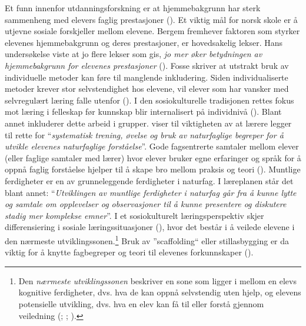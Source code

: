 \documentclass[main.tex]{subfiles}
\begin{document}
Et funn innenfor utdanningsforskning er at hjemmebakgrunn har sterk sammenheng med elevers faglig prestasjoner (). Et viktig mål for norsk skole er å utjevne sosiale forskjeller mellom elevene. Bergem fremhever faktoren som styrker elevenes hjemmebakgrunn og deres prestasjoner, er hovedsakelig lekser. Hans undersøkelse viste at jo flere lekser som gis, \emph{jo mer øker betydningen av hjemmebakgrunn for elevenes prestasjoner} (). Fosse skriver at utstrakt bruk av individuelle metoder kan føre til manglende inkludering. Siden individualiserte metoder krever stor selvstendighet hos elevene, vil elever som har vansker med selvregulært læring falle utenfor (). 
\newline\newline
I den sosiokulturelle tradisjonen rettes fokus mot læring i felleskap før kunnskap blir internalisert på individnivå (). Blant annet inkluderer dette arbeid i grupper.  viser til viktigheten av at lærere legger til rette for ``\emph{systematisk trening, øvelse og bruk av naturfaglige begreper for å utvikle elevenes naturfaglige forståelse}''. Gode fagsentrerte samtaler mellom elever (eller faglige samtaler med lærer) hvor elever bruker egne erfaringer og språk for å oppnå faglig forståelse hjelper til å skape bro mellom praksis og teori (). 
\newline\newline
Muntlige ferdigheter er en av grunneleggende ferdigheter i naturfag. I læreplanen står det blant annet: ``\emph{Utviklingen av muntlige ferdigheter i naturfag går fra å kunne lytte og samtale om opplevelser og observasjoner til å kunne presentere og diskutere stadig mer komplekse emner}''.
\newpage %
\hspace{-6mm}I et sosiokulturelt læringsperspektiv skjer differensiering i sosiale læringssituasjoner (), hvor det består i å veilede elevene i den nærmeste utviklingssonen.\footnote[2]{Den \emph{nærmeste utviklingssonen} beskriver en sone som ligger i mellom en elevs kognitive ferdigheter, dvs. hva de kan oppnå selvstendig uten hjelp, og elevens potensielle utvikling, dvs. hva en elev kan få til eller forstå gjennom veiledning (; ; ).} Bruk av ''scaffolding`` eller stillasbygging er da viktig for å knytte fagbegreper og teori til elevenes forkunnskaper ().
\newline\newline
\end{document}
